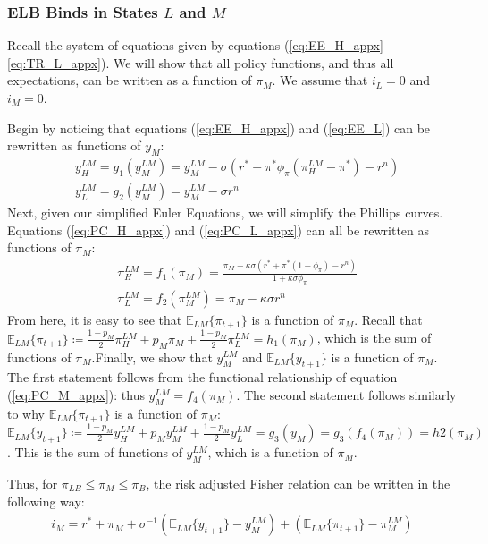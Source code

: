 \documentclass[11pt]{article}
\begin{document}
\begin{singlespace}
		\subsubsection{ELB Binds in States $L$ and $M$}
		
		Recall the system of equations given by equations (\ref{eq:EE_H_appx} - \ref{eq:TR_L_appx}). We will show that all policy functions, and thus all expectations, can be written as a function of $\pi_M$. We assume that $i_L = 0$ and $i_M = 0$.
		
		Begin by noticing that equations (\ref{eq:EE_H_appx}) and (\ref{eq:EE_L}) can be rewritten as functions of $y_M$:
		\begin{align}
		& y^{LM}_{H} = g_1(y^{LM}_M) = y^{LM}_M - \sigma\left(r^* + \pi^* \phi_{\pi}(\pi^{LM}_H - \pi^*) - r^n\right) \\
		& y^{LM}_{L} = g_2(y^{LM}_M)= y^{LM}_M - \sigma r^n 
		\end{align}
		Next, given our simplified Euler Equations, we will simplify the Phillips curves. Equations (\ref{eq:PC_H_appx}) and (\ref{eq:PC_L_appx}) can all be rewritten as functions of $\pi_M$:
		\begin{align}
		& \pi^{LM}_{H} = f_1(\pi_M) =  \frac{\pi_M -\kappa\sigma(r^* + \pi^*(1-\phi_{\pi})- r^n)}{1+\kappa\sigma\phi_{\pi}}\\
		& \pi^{LM}_{L} = f_2(\pi^{LM}_M) = \pi_M -\kappa\sigma r^n
		\end{align}
		From here, it is easy to see that $\mathbb{E}_{LM}\{\pi_{t+1}\}$ is a function of $\pi_M$. Recall that $\mathbb{E}_{LM}\{\pi_{t+1}\} \coloneqq \frac{1-p_M}{2}\pi^{LM}_H + p_M\pi_M + \frac{1-p_M}{2}\pi^{LM}_L = h_1(\pi_M)$, which is the sum of functions of $\pi_M$.Finally, we show that $y^{LM}_M$ and $\mathbb{E}_{LM}\{y_{t+1}\}$ is a function of $\pi_M$. The first statement follows from the functional relationship of equation (\ref{eq:PC_M_appx}): thus $y^{LM}_M = f_4(\pi_M)$. The second statement follows similarly to why $\mathbb{E}_{LM}\{\pi_{t+1}\}$ is a function of $\pi_M$: $\mathbb{E}_{LM}\{y_{t+1}\} \coloneqq \frac{1-p_M}{2}y^{LM}_H + p_My^{LM}_M + \frac{1-p_M}{2}y^{LM}_L = g_3(y_M) = g_3(f_4(\pi_M)) = h2(\pi_M)$. This is the sum of functions of $y^{LM}_M$, which is a function of $\pi_M$.
		
		Thus, for $\pi_{LB} \le \pi_M \le \pi_B$, the risk adjusted Fisher relation can be written in the following way:
		\begin{align}
			i_M = r^* + \pi_M + \sigma^{-1}\left(\mathbb{E}_{LM}\{y_{t+1}\} - y_M^{LM}\right) + \left(\mathbb{E}_{LM}\{\pi_{t+1}\} - \pi_M^{LM}\right)
		\end{align}
		

\end{singlespace}
\end{document}
